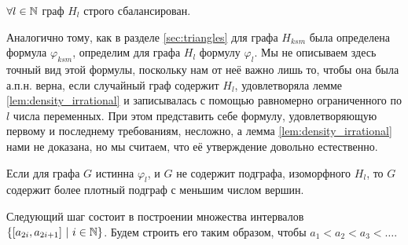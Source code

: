 \begin{Lem}
\label{lem:balanced}
$\forall l \in \mathbb {N} $ граф $H_l$ строго сбалансирован.
\end{Lem}

Аналогично тому, как в разделе \ref{sec:triangles} для графа $H_{ksm}$ была определена формула $\varphi_{ksm}$, определим для графа $H_l$ формулу $\varphi_l$.
Мы не описываем здесь точный вид этой формулы, поскольку нам от неё важно лишь то, чтобы она была а.п.н. верна, если случайный граф содержит $H_l$, удовлетворяла лемме \ref{lem:density_irrational} и записывалась с помощью равномерно ограниченного по $l$ числа переменных. 
При этом представить себе формулу, удовлетворяющую первому и последнему требованиям, несложно, а лемма \ref{lem:density_irrational} нами не доказана, но мы считаем, что её утверждение довольно естественно.

\begin{Lem} 
\label{lem:density_irrational}
Если для графа $G$ истинна $\varphi_l$, и $G$ не содержит подграфа, изоморфного $H_l$, то $G$ содержит более плотный подграф с меньшим числом вершин.
\end{Lem}



Следующий шаг состоит в построении множества интервалов $\{[a_{2i}, a_{2i+1}] ~ | ~ i \in \mathbb {N} \}$.
Будем строить его таким образом, чтобы $a_1 < a_2 < a_3 < \ldots$.

